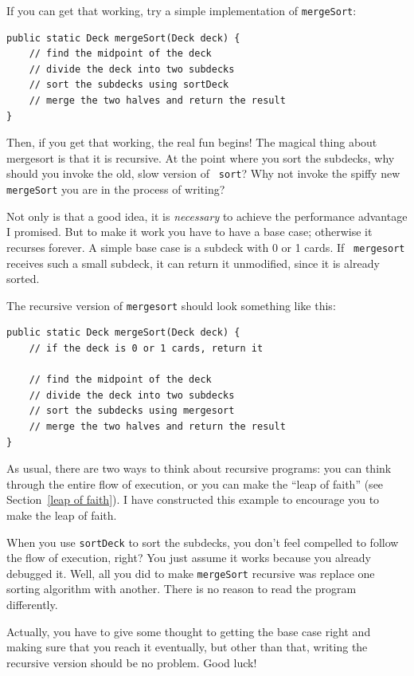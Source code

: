 \documentclass[12pt]{book}
\theoremstyle{exercise}
\begin{document}

If you can get that working, try a simple implementation of
{\tt mergeSort}:

\begin{lstlisting}
public static Deck mergeSort(Deck deck) {
    // find the midpoint of the deck
    // divide the deck into two subdecks
    // sort the subdecks using sortDeck
    // merge the two halves and return the result
}
\end{lstlisting}

Then, if you get that working, the real fun begins!  The magical thing
about mergesort is that it is recursive.  At the point where you sort
the subdecks, why should you invoke the old, slow version of {\tt
sort}?  Why not invoke the spiffy new {\tt mergeSort} you are in the
process of writing?

Not only is that a good idea, it is {\em necessary} to
achieve the performance advantage I promised.  But to make it
work you have to have a base case; otherwise it recurses
forever.  A simple base case is a subdeck with 0 or 1 cards.  If {\tt
mergesort} receives such a small subdeck, it can return it
unmodified, since it is already sorted.

The recursive version of {\tt mergesort} should look something
like this:

\begin{lstlisting}
public static Deck mergeSort(Deck deck) {
    // if the deck is 0 or 1 cards, return it

    // find the midpoint of the deck
    // divide the deck into two subdecks
    // sort the subdecks using mergesort
    // merge the two halves and return the result
}
\end{lstlisting}
%
As usual, there are two ways to think about recursive programs:
you can think through the entire flow of execution, or you
can make the ``leap of faith'' (see Section~\ref{leap of faith}).
I have constructed this example to encourage you to make the leap of faith.

When you use {\tt sortDeck} to sort the subdecks, you don't
feel compelled to follow the flow of execution, right?  You just
assume it works because you already
debugged it.  Well, all you did to make {\tt mergeSort} recursive was
replace one sorting algorithm with another.  There is no reason to read
the program differently.

Actually, you have to give some thought to getting the
base case right and making sure that you reach it eventually,
but other than that, writing the recursive version should be
no problem.  Good luck!
\end{document}

